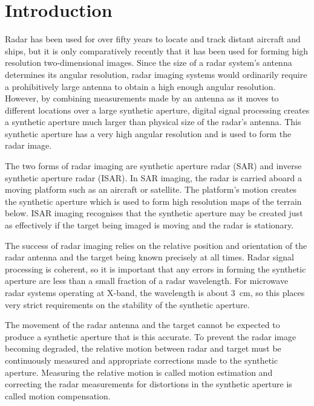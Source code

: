 %
%
%
%
%
%
%


\chapter{Introduction}
\label{in chp}

\bigletter Radar has been used for over fifty years to locate and track
distant aircraft and ships, but it is only comparatively recently that it
has been used for forming high resolution two-dimensional images.  Since
the size of a radar system's antenna determines its angular resolution,
radar imaging systems would ordinarily require a prohibitively large
antenna to obtain a high enough angular resolution.  However, by combining
measurements made by an antenna as it moves to different locations over a
large synthetic aperture, digital signal processing creates a synthetic
aperture much larger than physical size of the radar's antenna.  This
synthetic aperture has a very high angular resolution and is used to form
the radar image.

The two forms of radar imaging are synthetic aperture radar (SAR) and
inverse synthetic aperture radar (ISAR).  In SAR imaging, the radar is
carried aboard a moving platform such as an aircraft or satellite.  The
platform's motion creates the synthetic aperture which is used to form high
resolution maps of the terrain below.  ISAR imaging recognises that the
synthetic aperture may be created just as effectively if the target being
imaged is moving and the radar is stationary.

The success of radar imaging relies on the relative position and
orientation of the radar antenna and the target being known precisely at
all times.  Radar signal processing is coherent, so it is important that
any errors in forming the synthetic aperture are less than a small fraction
of a radar wavelength.  For microwave radar systems operating at X-band,
the wavelength is about 3~cm, so this places very strict requirements on
the stability of the synthetic aperture.

The movement of the radar antenna and the target cannot be expected to
produce a synthetic aperture that is this accurate.  To prevent the radar
image becoming degraded, the relative motion between radar and target must
be continuously measured and appropriate corrections made to the synthetic
aperture.  Measuring the relative motion is called motion estimation and 
correcting the radar measurements for distortions in the synthetic aperture
is called motion compensation.

